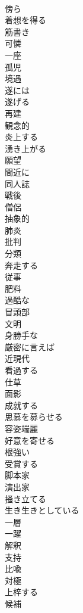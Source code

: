 \documentclass[8pt]{extreport}
\begin{document}
\begin{CJK}{UTF8}{min}
\\	傍ら
\\	着想を得る
\\	筋書き
\\	可憐
\\	一座
\\	孤児
\\	境遇
\\	遂には
\\	遂げる
\\	再建
\\	観念的
\\	炎上する
\\	湧き上がる
\\	願望
\\	間近に
\\	同人誌
\\	戦後
\\	僧侶
\\	抽象的
\\	肺炎
\\	批判
\\	分類
\\	奔走する
\\	従事
\\	肥料
\\	過酷な
\\	冒頭部
\\	文明
\\	身勝手な
\\	厳密に言えば
\\	近現代
\\	看過する
\\	仕草
\\	面影
\\	成就する
\\	思慕を募らせる
\\	容姿端麗
\\	好意を寄せる
\\	根強い
\\	受賞する
\\	脚本家
\\	演出家
\\	掻き立てる
\\	生き生きとしている
\\	一層
\\	一躍
\\	解釈
\\	支持
\\	比喩
\\	対極
\\	上梓する
\\	候補

\end{CJK}
\end{document}
